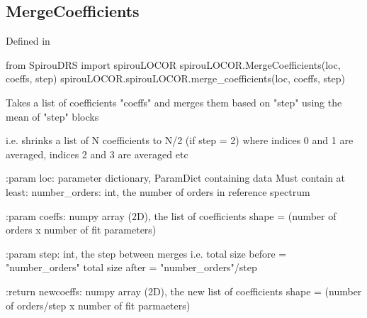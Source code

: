 \begin{minipage}{\textwidth}
\subsection{MergeCoefficients}

Defined in \spirouLOCOR{}

\begin{pythonbox}
from SpirouDRS import spirouLOCOR
spirouLOCOR.MergeCoefficients(loc, coeffs, step)
spirouLOCOR.spirouLOCOR.merge_coefficients(loc, coeffs, step)
\end{pythonbox}

\begin{pythondocstring}
Takes a list of coefficients "coeffs" and merges them based on "step"
using the mean of "step" blocks

i.e. shrinks a list of N coefficients to N/2 (if step = 2) where
     indices 0 and 1 are averaged, indices 2 and 3 are averaged etc

:param loc: parameter dictionary, ParamDict containing data
        Must contain at least:
            number_orders: int, the number of orders in reference spectrum

:param coeffs: numpy array (2D), the list of coefficients
               shape = (number of orders x number of fit parameters)

:param step: int, the step between merges
             i.e. total size before = "number_orders"
                  total size after = "number_orders"/step

:return newcoeffs: numpy array (2D), the new list of coefficients
            shape = (number of orders/step x number of fit parmaeters)
\end{pythondocstring}
\end{minipage}

